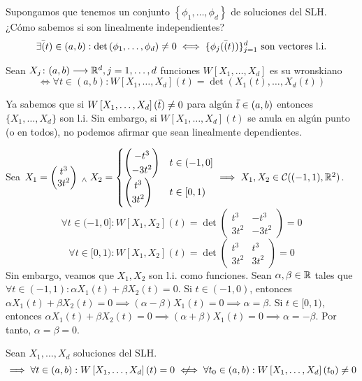 Supongamos que tenemos un conjunto $\left\{\phi_1, \dots, \phi_d\right\}$ de soluciones del SLH. ¿Cómo sabemos si son linealmente independientes?
\[\exists \Bar(t) \in (a,b) : \det{\left(\phi_1, \dots, \phi_d\right)} \neq 0 \iff \{\phi_j(\Bar(t))\}_{j=1}^d\text{ son vectores l.i.}\]

\begin{defn}[Wronskiano]
	Sean $X_j \colon (a,b) \longrightarrow \mathbb{R}^d, j=1, \dots, d$ funciones $W\left[X_1, \dots, X_d\right]$ es su wronskiano
	\[\iff \forall t \in (a,b) : W\left[X_1, \dots, X_d\right](t) = \det{\left(X_1(t), \dots, X_d(t)\right)}\]
\end{defn}

Ya sabemos que si $W\left[X_1, \dots, X_d\right](\Bar{t}) \neq 0$ para algún $\Bar{t}\in(a,b)$ entonces $\{X_1, \dots, X_d\}$ son l.i. Sin embargo, si $W\left[X_1, \dots, X_d\right](t)$ se anula en algún punto (o en todos), no podemos afirmar que sean linealmente dependientes.

\begin{ejem}
	Sea $X_1 = \begin{pmatrix}
			t^3 \\
			3t^2
		\end{pmatrix} \; _{\wedge} \; X_2 = \begin{cases}
			\begin{pmatrix}
				-t^3 \\
				-3t^2
			\end{pmatrix} & t \in (-1, 0] \\
			\begin{pmatrix}
					t^3 \\
					3t^2
				\end{pmatrix} & t \in [0, 1)
		\end{cases} \implies X_1, X_2 \in \mathcal{C}((-1, 1), \mathbb{R}^2)$.
	\[\forall t \in (-1, 0] : W\left[X_1, X_2\right](t) = \det{\begin{pmatrix}
					t^3  & -t^3  \\
					3t^2 & -3t^2
				\end{pmatrix}} = 0\]
		\[\forall t \in [0, 1) : W\left[X_1, X_2\right](t) = \det{\begin{pmatrix}
				t^3  & t^3  \\
				3t^2 & 3t^2
			\end{pmatrix}} = 0\]
	Sin embargo, veamos que $X_1, X_2$ son l.i. como funciones. Sean $\alpha, \beta \in \mathbb{R}$ tales que $\forall t \in (-1, 1) :\alpha X_1(t) + \beta X_2(t) = 0$. Si $t \in (-1, 0)$, entonces $\alpha X_1(t) + \beta X_2(t) = 0 \implies (\alpha - \beta)X_1(t) = 0 \implies \alpha = \beta$. Si $t \in [0, 1)$, entonces $\alpha X_1(t) + \beta X_2(t) = 0 \implies (\alpha + \beta)X_1(t) = 0 \implies \alpha = -\beta$. Por tanto, $\alpha = \beta = 0$.
\end{ejem}

\begin{prop}
	Sean $X_1, \dots, X_d$ soluciones del SLH.
	\[\implies \forall t \in (a, b) : W\left[X_1, \dots, X_d\right](t) = 0 \niff  \forall t_0 \in (a, b) : W\left[X_1, \dots, X_d\right](t_0) \neq 0\]
\end{prop}